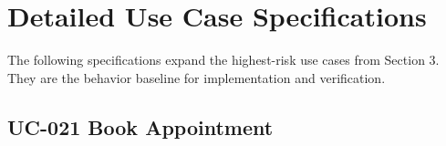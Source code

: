 
\section{Detailed Use Case Specifications}
The following specifications expand the highest-risk use cases from Section 3. They are the behavior baseline for implementation and verification. 

\subsection{UC-021 Book Appointment}

